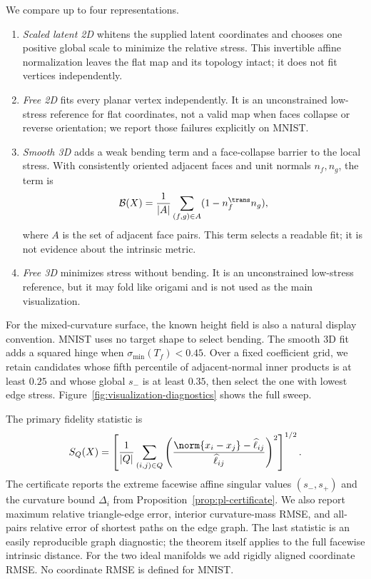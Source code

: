 We compare up to four representations.
\begin{enumerate}
  \item \emph{Scaled latent 2D} whitens the supplied latent coordinates and
  chooses one positive global scale to minimize the relative stress.  This
  invertible affine normalization leaves the flat map and its topology intact;
  it does not fit vertices independently.
  \item \emph{Free 2D} fits every planar vertex independently.  It is an
  unconstrained low-stress reference for flat coordinates, not a valid map when faces collapse or
  reverse orientation; we report those failures explicitly on MNIST.
  \item \emph{Smooth 3D} adds a weak bending term and a face-collapse barrier
  to the local stress.  With
  consistently oriented adjacent faces and unit normals $n_f,n_g$, the term is
  \begin{equation}
   \mathcal B(X)=\frac1{|A|}\sum_{(f,g)\in A}(1-n_f^{\trans}n_g),
   \label{eq:bending-convention}
  \end{equation}
  where $A$ is the set of adjacent face pairs.  This term selects a readable fit;
  it is not evidence about the intrinsic metric.
  \item \emph{Free 3D} minimizes stress without bending.  It is an
  unconstrained low-stress reference, but it may fold like origami and is
  not used as the main visualization.
\end{enumerate}
For the mixed-curvature surface, the known height field is also a
natural display convention.  MNIST uses no target shape to select bending.
The smooth 3D fit adds a squared hinge when
$\sigma_{\min}(T_f)<0.45$.
Over a fixed coefficient grid, we retain candidates whose fifth percentile of
adjacent-normal inner products is at least $0.25$ and whose global $s_-$ is at
least $0.35$, then select the one with lowest edge stress.
Figure~\ref{fig:visualization-diagnostics} shows the full sweep.

The primary fidelity statistic is
\begin{equation}
 S_Q(X)=\left[
 \frac1{|Q|}\sum_{(i,j)\in Q}
 \left(
 \frac{\norm{x_i-x_j}-\widehat\ell_{ij}}
 {\widehat\ell_{ij}}
 \right)^2\right]^{1/2}.
 \label{eq:reported-stress}
\end{equation}
The certificate reports the extreme facewise affine singular values
$(s_-,s_+)$ and the curvature bound $\Delta_i$ from
Proposition~\ref{prop:pl-certificate}.  We also report maximum relative
triangle-edge error, interior curvature-mass RMSE, and all-pairs relative
error of shortest paths on the edge graph.  The last statistic is an easily
reproducible graph diagnostic; the theorem itself applies to the full
facewise intrinsic distance.  For the two ideal manifolds we add rigidly aligned
coordinate RMSE.  No coordinate RMSE is defined for MNIST.

